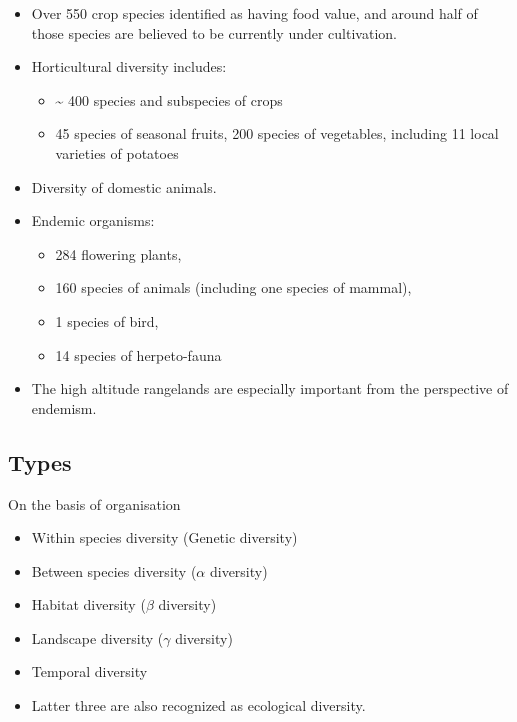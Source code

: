 \documentclass[
  ignorenonframetext,
  aspectratio=169]{beamer}
\providecommand{\tightlist}{%
  \setlength{\itemsep}{0pt}\setlength{\parskip}{0pt}}
\begin{document}
\begin{frame}{}
\protect\hypertarget{section-9}{}
\begin{itemize}
\tightlist
\item
  Over 550 crop species identified as having food value, and around half
  of those species are believed to be currently under cultivation.
\item
  Horticultural diversity includes:

  \begin{itemize}
  \tightlist
  \item
    \textasciitilde{} 400 species and subspecies of crops
  \item
    45 species of seasonal fruits, 200 species of vegetables, including
    11 local varieties of potatoes
  \end{itemize}
\item
  Diversity of domestic animals.
\item
  Endemic organisms:

  \begin{itemize}
  \tightlist
  \item
    284 flowering plants,
  \item
    160 species of animals (including one species of mammal),
  \item
    1 species of bird,
  \item
    14 species of herpeto-fauna
  \end{itemize}
\item
  The high altitude rangelands are especially important from the
  perspective of endemism.
\end{itemize}
\end{frame}

\hypertarget{types}{%
\subsection{Types}\label{types}}

\begin{frame}{On the basis of organisation}
\protect\hypertarget{on-the-basis-of-organisation}{}
\begin{itemize}
\tightlist
\item
  Within species diversity (Genetic diversity)
\item
  Between species diversity (\(\alpha\) diversity)
\item
  Habitat diversity (\(\beta\) diversity)
\item
  Landscape diversity (\(\gamma\) diversity)
\item
  Temporal diversity
\item
  Latter three are also recognized as ecological diversity.
\end{itemize}
\end{frame}
\end{document}
